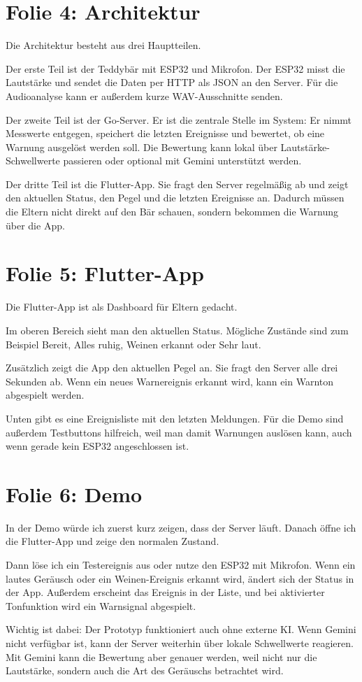 \documentclass[11pt,a4paper]{article}
\newcommand{\folie}[2]{%
  \section*{Folie #1: #2}
}
\begin{document}
\folie{4}{Architektur}
Die Architektur besteht aus drei Hauptteilen.

Der erste Teil ist der Teddybär mit ESP32 und Mikrofon. Der ESP32 misst
die Lautstärke und sendet die Daten per HTTP als JSON an den Server. Für
die Audioanalyse kann er außerdem kurze WAV-Ausschnitte senden.

Der zweite Teil ist der Go-Server. Er ist die zentrale Stelle im System:
Er nimmt Messwerte entgegen, speichert die letzten Ereignisse und
bewertet, ob eine Warnung ausgelöst werden soll. Die Bewertung kann
lokal über Lautstärke-Schwellwerte passieren oder optional mit Gemini
unterstützt werden.

Der dritte Teil ist die Flutter-App. Sie fragt den Server regelmäßig ab
und zeigt den aktuellen Status, den Pegel und die letzten Ereignisse an.
Dadurch müssen die Eltern nicht direkt auf den Bär schauen, sondern
bekommen die Warnung über die App.

\folie{5}{Flutter-App}
Die Flutter-App ist als Dashboard für Eltern gedacht.

Im oberen Bereich sieht man den aktuellen Status. Mögliche Zustände sind
zum Beispiel \glqq Bereit\grqq{}, \glqq Alles ruhig\grqq{}, \glqq
Weinen erkannt\grqq{} oder \glqq Sehr laut\grqq{}.

Zusätzlich zeigt die App den aktuellen Pegel an. Sie fragt den Server
alle drei Sekunden ab. Wenn ein neues Warnereignis erkannt wird, kann
ein Warnton abgespielt werden.

Unten gibt es eine Ereignisliste mit den letzten Meldungen. Für die Demo
sind außerdem Testbuttons hilfreich, weil man damit Warnungen auslösen
kann, auch wenn gerade kein ESP32 angeschlossen ist.

\folie{6}{Demo}
In der Demo würde ich zuerst kurz zeigen, dass der Server läuft. Danach
öffne ich die Flutter-App und zeige den normalen Zustand.

Dann löse ich ein Testereignis aus oder nutze den ESP32 mit Mikrofon.
Wenn ein lautes Geräusch oder ein Weinen-Ereignis erkannt wird, ändert
sich der Status in der App. Außerdem erscheint das Ereignis in der
Liste, und bei aktivierter Tonfunktion wird ein Warnsignal abgespielt.

Wichtig ist dabei: Der Prototyp funktioniert auch ohne externe KI. Wenn
Gemini nicht verfügbar ist, kann der Server weiterhin über lokale
Schwellwerte reagieren. Mit Gemini kann die Bewertung aber genauer
werden, weil nicht nur die Lautstärke, sondern auch die Art des Geräuschs
betrachtet wird.
\end{document}
